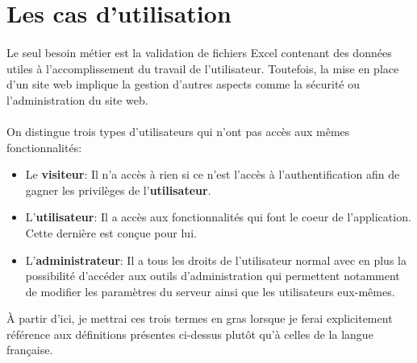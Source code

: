 \section{Les cas d'utilisation}
\label{sec:use-cases}

\paragraph{}
Le seul besoin métier est la validation de fichiers Excel contenant des données utiles à l'accomplissement du travail de l'utilisateur. Toutefois, la mise en place d'un site web implique la gestion d'autres aspects comme la sécurité ou l'administration du site web.

\paragraph{}
On distingue trois types d'utilisateurs qui n'ont pas accès aux mêmes fonctionnalités:
\begin{itemize}
    \item Le \textbf{visiteur}: Il n'a accès à rien si ce n'est l'accès à l'authentification afin de gagner les privilèges de l'\textbf{utilisateur}.
    \item L'\textbf{utilisateur}: Il a accès aux fonctionnalités qui font le coeur de l'application. Cette dernière est conçue pour lui.
    \item L'\textbf{administrateur}: Il a tous les droits de l'utilisateur normal avec en plus la possibilité d'accéder aux outils d'administration qui permettent notamment de modifier les paramètres du serveur ainsi que les utilisateurs eux-mêmes.
\end{itemize}

À partir d'ici, je mettrai ces trois termes en gras lorsque je ferai explicitement référence aux définitions présentes ci-dessus plutôt qu'à celles de la langue française.








